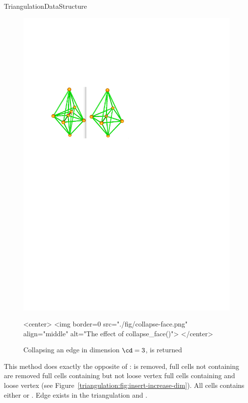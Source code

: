 \begin{ccRefConcept}{TriangulationDataStructure}
\begin{figure}[ht]
\begin{ccTexOnly}
\begin{center}
\includegraphics{Triangulation_ref/fig/collapse-face.pdf}
\end{center}
\end{ccTexOnly}
\begin{ccHtmlOnly}
<center>
<img border=0 src="./fig/collapse-face.png" align="middle" alt="The effect of collapse_face()">
</center>
\end{ccHtmlOnly}
\caption{Collapsing an edge in dimension $\cd=3$,  is returned\label{triangulation:fig:collapse-face}}
\end{figure}

 {This method does exactly the opposite of
:
 is removed,
full cells not containing  are removed
full cells containing  but not  loose vertex 
full cells containing  and  loose vertex 
(see Figure~\ref{triangulation:fig:insert-increase-dim}).
\ccPrecond 
All cells contains either  or .
Edge  exists in the triangulation
and .
}


\end{ccRefConcept}
